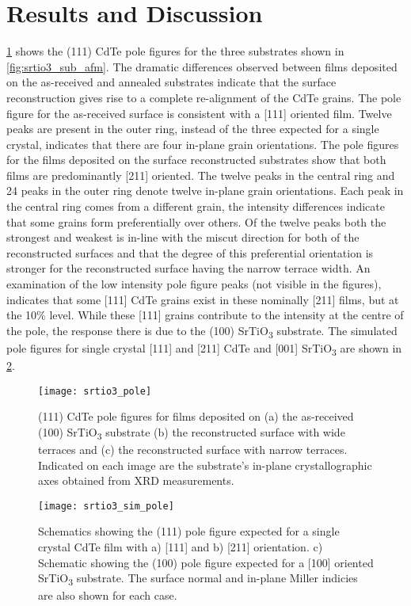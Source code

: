 \section{Results and Discussion}
\cref{fig:srtio3_pole} shows the (111) CdTe pole figures for the three substrates shown in \cref{fig:srtio3_sub_afm}.
The dramatic differences observed between films deposited on the as-received and annealed substrates indicate that the surface reconstruction gives rise to a complete re-alignment of the CdTe grains.
The pole figure for the as-received surface is consistent with a [111] oriented film.
Twelve peaks are present in the outer ring, instead of the three expected for a single crystal, indicates that there are four in-plane grain orientations.
The pole figures for the films deposited on the surface reconstructed substrates show that both films are predominantly [211] oriented.
The twelve peaks in the central ring and 24 peaks in the outer ring denote twelve in-plane grain orientations.
Each peak in the central ring comes from a different grain, the intensity differences indicate that some grains form preferentially over others.
Of the twelve peaks both the strongest and weakest is in-line with the miscut direction for both of the reconstructed surfaces and that the degree of this preferential orientation is stronger for the reconstructed surface having the narrow terrace width.
An examination of the low intensity pole figure peaks (not visible in the figures), indicates that some [111] CdTe grains exist in these nominally [211] films, but at the 10\% level.
While these [111] grains contribute to
the intensity at the centre of the pole, the response there is due to the (100) SrTiO\textsubscript{3} substrate.
The simulated pole figures for single crystal [111] and [211] CdTe and [001] SrTiO\textsubscript{3} are shown in \cref{fig:srtio3_sim_pole}.
\begin{figure}
 \centering \texttt{[image: srtio3\_pole]}
 \caption[Pole figures of CdTe grown on SrTiO\textsubscript{3}]{\label{fig:srtio3_pole}(111) CdTe pole figures for films deposited on (a) the as-received (100) SrTiO\textsubscript{3} substrate (b) the reconstructed surface with wide terraces and (c) the reconstructed surface with narrow terraces.
  Indicated on each image are the substrate's in-plane crystallographic axes obtained from XRD measurements.}
\end{figure}
\begin{figure}
 \centering \texttt{[image: srtio3\_sim\_pole]}
 \caption[Simulated pole figures of CdTe on SrTiO\(_3\) surfaces]{\label{fig:srtio3_sim_pole}Schematics showing the (111) pole figure expected for a single crystal CdTe film with a) [111] and b) [211] orientation.
  c) Schematic showing the (100) pole figure expected for a [100] oriented SrTiO\textsubscript{3} substrate.
  The surface normal and in-plane Miller indicies are also shown for each case.}
\end{figure}

